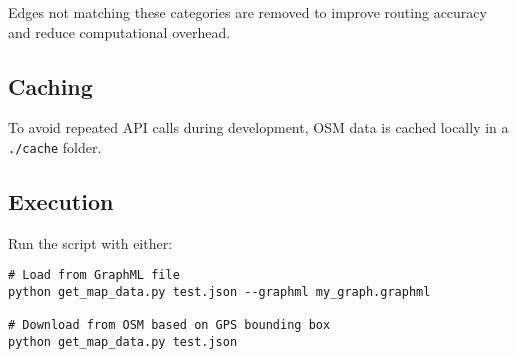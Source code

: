 \documentclass{article}
\begin{document}
Edges not matching these categories are removed to improve routing accuracy and reduce computational overhead.

\subsection{Caching}
To avoid repeated API calls during development, OSM data is cached locally in a \texttt{./cache} folder.

\subsection{Execution}
Run the script with either:

\begin{lstlisting}
# Load from GraphML file
python get_map_data.py test.json --graphml my_graph.graphml

# Download from OSM based on GPS bounding box
python get_map_data.py test.json
\end{lstlisting}
\end{document}
